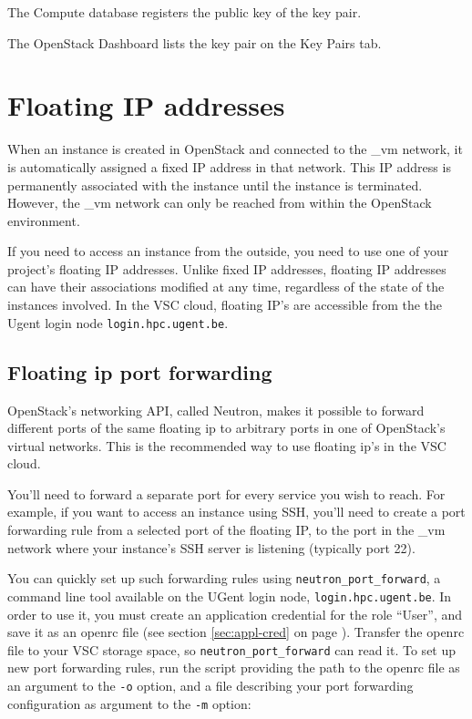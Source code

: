The Compute database registers the public key of the key pair.

The \gls{OpenStack Dashboard} lists the key pair on the Key Pairs tab.

\section{Floating IP addresses}\label{sec:floating-ip}
When an instance is created in \gls{OpenStack} and connected to the
\_vm network, it is automatically assigned a fixed IP address in that
network. This IP address is permanently associated with the instance
until the instance is terminated.  However, the \_vm network can only
be reached from within the OpenStack environment.

If you need to access an instance from the outside, you need to use
one of your project's floating IP addresses.  Unlike fixed IP
addresses, floating IP addresses can have their associations modified
at any time, regardless of the state of the instances involved.  In
the VSC cloud, floating IP's are accessible from the the Ugent login
node \lstinline{login.hpc.ugent.be}.

\subsection*{Floating ip port forwarding}
OpenStack's networking API, called Neutron, makes it possible to
forward different ports of the same floating ip to arbitrary ports in
one of OpenStack's virtual networks.  This is the recommended way to
use floating ip's in the VSC cloud.

You'll need to forward a separate port for every service you wish to
reach.  For example, if you want to access an instance using SSH,
you'll need to create a port forwarding rule from a selected port of
the floating IP, to the port in the \_vm network where your instance's
SSH server is listening (typically port 22).

You can quickly set up such forwarding rules using
\lstinline{neutron_port_forward}, a command line tool available on the
UGent login node, \lstinline{login.hpc.ugent.be}.  In order to use it,
you must create an application credential for the role ``User'', and
save it as an openrc file (see section \ref{sec:appl-cred} on page
\pageref{sec:appl-cred}).  Transfer the openrc file to your VSC
storage space, so \lstinline{neutron_port_forward} can read it.  To
set up new port forwarding rules, run the script providing the path to
the openrc file as an argument to the \lstinline{-o} option, and a
file describing your port forwarding configuration as argument to the
\lstinline{-m} option:

